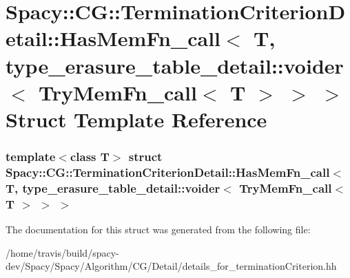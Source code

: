 \hypertarget{structSpacy_1_1CG_1_1TerminationCriterionDetail_1_1HasMemFn__call_3_01T_00_01type__erasure__tabl29bc06d6b7f4997d013121c001299489}{\section{\-Spacy\-:\-:\-C\-G\-:\-:\-Termination\-Criterion\-Detail\-:\-:\-Has\-Mem\-Fn\-\_\-call$<$ \-T, type\-\_\-erasure\-\_\-table\-\_\-detail\-:\-:voider$<$ \-Try\-Mem\-Fn\-\_\-call$<$ \-T $>$ $>$ $>$ \-Struct \-Template \-Reference}
\label{structSpacy_1_1CG_1_1TerminationCriterionDetail_1_1HasMemFn__call_3_01T_00_01type__erasure__tabl29bc06d6b7f4997d013121c001299489}
}
\subsubsection*{template$<$class T$>$ struct Spacy\-::\-C\-G\-::\-Termination\-Criterion\-Detail\-::\-Has\-Mem\-Fn\-\_\-call$<$ T, type\-\_\-erasure\-\_\-table\-\_\-detail\-::voider$<$ Try\-Mem\-Fn\-\_\-call$<$ T $>$ $>$ $>$}



\-The documentation for this struct was generated from the following file\-:\begin{DoxyCompactItemize}
\item 
/home/travis/build/spacy-\/dev/\-Spacy/\-Spacy/\-Algorithm/\-C\-G/\-Detail/details\-\_\-for\-\_\-termination\-Criterion.\-hh\end{DoxyCompactItemize}
